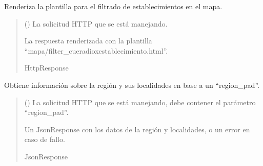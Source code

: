 \documentclass[letterpaper,10pt,spanish]{sphinxmanual}
\begin{document}
\begin{fulllineitems}

\pysigstartsignatures
{}
\pysigstopsignatures
\sphinxAtStartPar
Renderiza la plantilla para el filtrado de establecimientos en el mapa.
\begin{quote}\begin{description}
\sphinxAtStartPar
{} () \textendash{} La solicitud HTTP que se está manejando.

\sphinxAtStartPar
La respuesta renderizada con la plantilla “mapa/filter\_cueradioxestablecimiento.html”.

\sphinxAtStartPar
HttpResponse

\end{description}\end{quote}

\end{fulllineitems}



\begin{fulllineitems}

\pysigstartsignatures
{}
\pysigstopsignatures
\sphinxAtStartPar
Obtiene información sobre la región y sus localidades en base a un “region\_pad”.
\begin{quote}\begin{description}
\sphinxAtStartPar
{} () \textendash{} La solicitud HTTP que se está manejando, debe contener el parámetro “region\_pad”.

\sphinxAtStartPar
Un JsonResponse con los datos de la región y localidades, o un error en caso de fallo.

\sphinxAtStartPar
JsonResponse

\end{description}\end{quote}

\end{fulllineitems}
\end{document}
